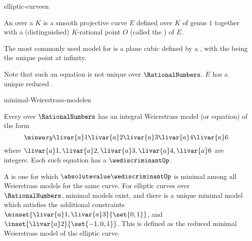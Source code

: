 \begin{mhmodnl}{elliptic-curve}{en}
  \begin{definition}[id=ec.q.def]
    An  over a  $K$ is a smooth projective
    curve $E$ defined over $K$ of genus $1$ together with a (distinguished) $K$-rational 
    point $O$ (called the ) of $E$.
  \end{definition}
  
  \begin{assertion}[type=remark]
    The most commonly used model for  is a plane cubic defined by
    a , with the 
    being the unique point at infinity.
  \end{assertion}
  
  \begin{assertion}[type=remark]
     Note that such an equation is not unique over
    $\RationalNumbers$. $E$ has a unique reduced
    .
  \end{assertion}
\end{mhmodnl}

\begin{mhmodnl}{minimal-Weierstrass-model}{en}
  \begin{definition}[id=ec.q.minimal-Weierstrass-model.def, 
  		title=Minimal Weierstrass model of an elliptic curve of the $\RationalNumbers$]
    Every  over $\RationalNumbers$ has an integral
    Weierstrass model (or equation) of the form
    \[\minwe xy{\livar{a}1}{\livar{a}2}{\livar{a}3}{\livar{a}4}{\livar{a}6}\]
    where $\livar{a}1,\livar{a}2,\livar{a}3,\livar{a}4,\livar{a}6$ are integers.  Each
    such equation has a 
    $\wediscriminantOp$.

    A  is one for which
    $\absolutevalue\wediscriminantOp$ is minimal among all Weierstrass models for the same
    curve.  For elliptic curves over $\RationalNumbers$, minimal models exist, and there
    is a unique minimal model which satisfies the additional constraints
    $\minset{\livar{a}1,\livar{a}3}{\set{0,1}}$, and $\inset{\livar{a}2}{\set{-1,0,1}}$. 
    This is defined as the reduced minimal Weierstrass model of the elliptic curve.
  \end{definition}
\end{mhmodnl}
